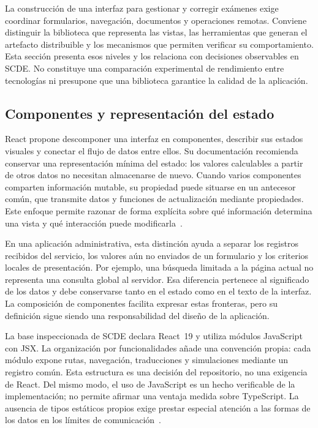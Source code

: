 La construcción de una interfaz para gestionar y corregir exámenes exige
coordinar formularios, navegación, documentos y operaciones remotas. Conviene
distinguir la biblioteca que representa las vistas, las herramientas que generan
el artefacto distribuible y los mecanismos que permiten verificar su comportamiento.
Esta sección presenta esos niveles y los relaciona con decisiones observables
en SCDE. No constituye una comparación experimental de rendimiento entre
tecnologías ni presupone que una biblioteca garantice la calidad de la aplicación.

\subsection{Componentes y representación del estado}

React propone descomponer una interfaz en componentes, describir sus estados
visuales y conectar el flujo de datos entre ellos. Su documentación recomienda
conservar una representación mínima del estado: los valores calculables a partir
de otros datos no necesitan almacenarse de nuevo. Cuando varios componentes
comparten información mutable, su propiedad puede situarse en un antecesor común,
que transmite datos y funciones de actualización mediante propiedades.
Este enfoque permite razonar de forma explícita sobre qué información determina
una vista y qué interacción puede modificarla~\cite{codex_react_thinking}.

En una aplicación administrativa, esta distinción ayuda a separar los registros
recibidos del servicio, los valores aún no enviados de un formulario y los
criterios locales de presentación. Por ejemplo, una búsqueda limitada a la página
actual no representa una consulta global al servidor. Esa diferencia pertenece al
significado de los datos y debe conservarse tanto en el estado como en el texto
de la interfaz. La composición de componentes facilita expresar estas fronteras,
pero su definición sigue siendo una responsabilidad del diseño de la aplicación.

La base inspeccionada de SCDE declara React~19 y utiliza módulos JavaScript con
JSX. La organización por funcionalidades añade una convención propia: cada módulo
expone rutas, navegación, traducciones y simulaciones mediante un registro común.
Esta estructura es una decisión del repositorio, no una exigencia de React.
Del mismo modo, el uso de JavaScript es un hecho verificable de la implementación;
no permite afirmar una ventaja medida sobre TypeScript. La ausencia de tipos
estáticos propios exige prestar especial atención a las formas de los datos en
los límites de comunicación~\cite{codex_scde_frontend_architecture}.

